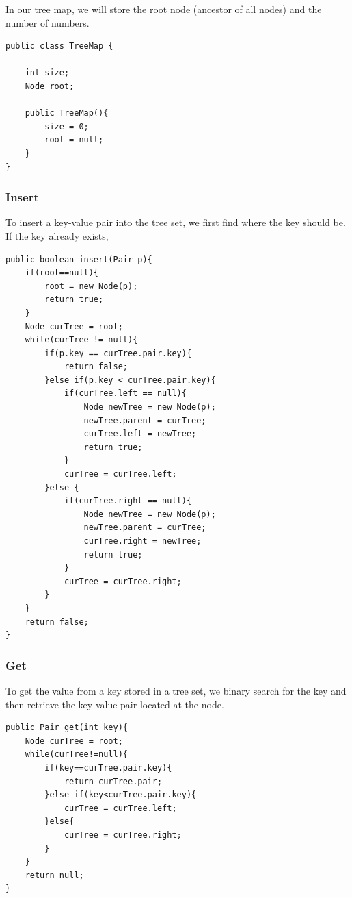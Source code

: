 \documentclass[11pt,oneside]{book}
\begin{document}
In our tree map, we will store the root node (ancestor of all nodes) and the number of numbers.

\begin{lstlisting}
public class TreeMap {

    int size;
    Node root;
    
    public TreeMap(){
        size = 0;
        root = null;
    }
}
\end{lstlisting}

\subsubsection{Insert}

To insert a key-value pair into the tree set, we first find where the key should be. If the key already exists,

\begin{lstlisting}
public boolean insert(Pair p){
    if(root==null){
        root = new Node(p);
        return true;
    }
    Node curTree = root;        
    while(curTree != null){
        if(p.key == curTree.pair.key){
            return false;
        }else if(p.key < curTree.pair.key){
            if(curTree.left == null){
                Node newTree = new Node(p);
                newTree.parent = curTree;
                curTree.left = newTree;
                return true;
            }
            curTree = curTree.left;
        }else {
            if(curTree.right == null){
                Node newTree = new Node(p);
                newTree.parent = curTree;
                curTree.right = newTree;
                return true;
            }
            curTree = curTree.right;
        }
    }
    return false;
}
\end{lstlisting}

\subsubsection{Get}

To get the value from a key stored in a tree set, we binary search for the key and then retrieve the key-value pair located at the node.

\begin{lstlisting}
public Pair get(int key){
    Node curTree = root;
    while(curTree!=null){
        if(key==curTree.pair.key){
            return curTree.pair;
        }else if(key<curTree.pair.key){
            curTree = curTree.left;
        }else{
            curTree = curTree.right;
        }
    }
    return null;
}
\end{lstlisting}
\end{document}
